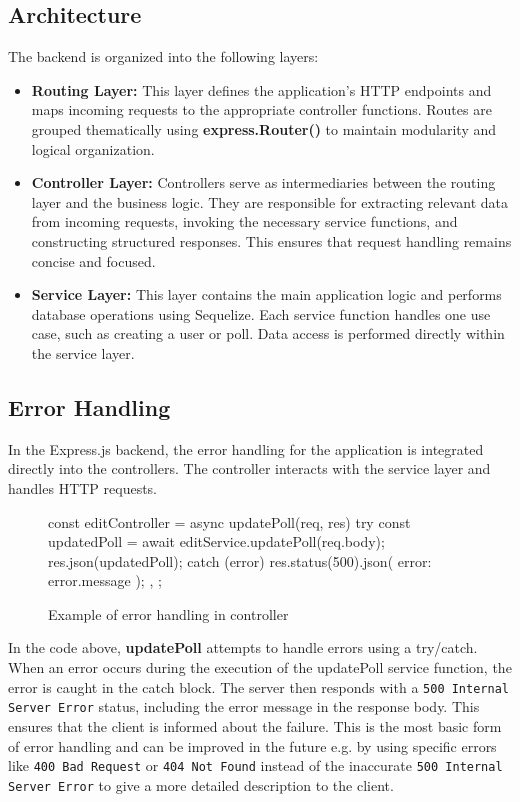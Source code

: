 \documentclass[a4paper,12pt]{report}
\begin{document}
\subsection{Architecture}
The backend is organized into the following layers:
\begin{itemize}
	\item \textbf{Routing Layer:} This layer defines the application's HTTP endpoints and maps incoming requests to the appropriate controller functions. Routes are grouped thematically using \textbf{express.Router()} to maintain modularity and logical organization.
	
	\item \textbf{Controller Layer:} Controllers serve as intermediaries between the routing layer and the business logic. They are responsible for extracting relevant data from incoming requests, invoking the necessary service functions, and constructing structured responses. This ensures that request handling remains concise and focused.
	
	\item \textbf{Service Layer:} This layer contains the main application logic and performs database operations using Sequelize. Each service function handles one use case, such as creating a user or poll. Data access is performed directly within the service layer. \\
\end{itemize}
\subsection{Error Handling}
In the Express.js backend, the error handling for the application is integrated directly into the controllers. The controller interacts with the service layer and handles HTTP requests. 
\begin{figure}[H]
	\begin{code}
		const editController = {
			async updatePoll(req, res) {
				try {
					const updatedPoll = await editService.updatePoll(req.body);
					res.json(updatedPoll);
				} catch (error) {
					res.status(500).json({ error: error.message });
				}
			},
		};
	\end{code}
	\caption{Example of error handling in controller}
	\label{fig:controller-err}
\end{figure}
\noindent
In the code above, \textbf{updatePoll} attempts to handle errors using a try/catch. When an error occurs during the execution of the updatePoll service function, the error is caught in the catch block. The server then responds with a \texttt{500 Internal Server Error} status, including the error message in the response body. This ensures that the client is informed about the failure. This is the most basic form of error handling and can be improved in the future e.g. by using specific errors like \texttt{400 Bad Request} or \texttt{404 Not Found} instead of the inaccurate \texttt{500 Internal Server Error} to give a more detailed description to the client. \\
\end{document}

